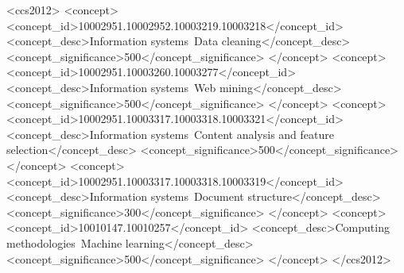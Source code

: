 \documentclass[sigconf]{acmart}
\begin{document}
%
%
\begin{CCSXML}
<ccs2012>
<concept>
<concept_id>10002951.10002952.10003219.10003218</concept_id>
<concept_desc>Information systems~Data cleaning</concept_desc>
<concept_significance>500</concept_significance>
</concept>
<concept>
<concept_id>10002951.10003260.10003277</concept_id>
<concept_desc>Information systems~Web mining</concept_desc>
<concept_significance>500</concept_significance>
</concept>
<concept>
<concept_id>10002951.10003317.10003318.10003321</concept_id>
<concept_desc>Information systems~Content analysis and feature selection</concept_desc>
<concept_significance>500</concept_significance>
</concept>
<concept>
<concept_id>10002951.10003317.10003318.10003319</concept_id>
<concept_desc>Information systems~Document structure</concept_desc>
<concept_significance>300</concept_significance>
</concept>
<concept>
<concept_id>10010147.10010257</concept_id>
<concept_desc>Computing methodologies~Machine learning</concept_desc>
<concept_significance>500</concept_significance>
</concept>
</ccs2012>
\end{CCSXML}



\maketitle




 
\end{document}
